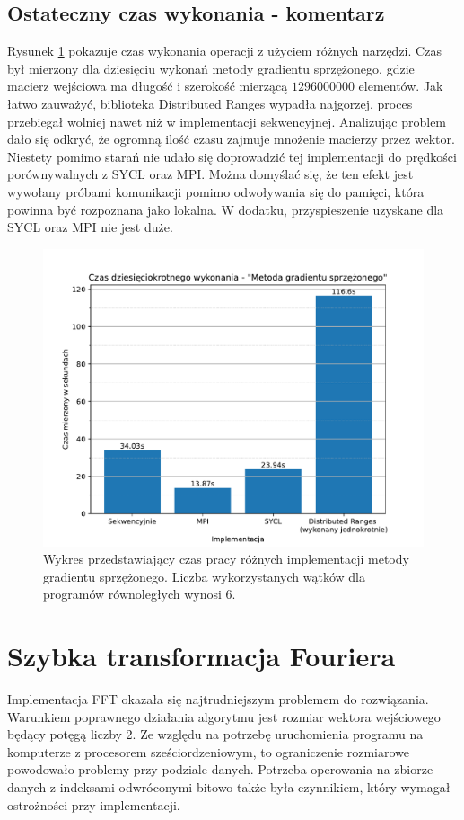 \documentclass[a4paper,12pt]{book} %
\begin{document}
\subsection{Ostateczny czas wykonania - komentarz}
Rysunek \ref{fig:wykonanie-cg} pokazuje czas wykonania operacji z użyciem różnych narzędzi. Czas był mierzony dla dziesięciu wykonań metody gradientu sprzężonego, gdzie macierz wejściowa ma długość i szerokość mierzącą $1296000000$ elementów. Jak łatwo zauważyć, biblioteka Distributed Ranges wypadła najgorzej, proces przebiegał wolniej nawet niż w implementacji sekwencyjnej. Analizując problem dało się odkryć, że ogromną ilość czasu zajmuje mnożenie macierzy przez wektor. Niestety pomimo starań nie udało się doprowadzić tej implementacji do prędkości porównywalnych z SYCL oraz MPI. Można domyślać się, że ten efekt jest wywołany próbami komunikacji pomimo odwoływania się do pamięci, która powinna być rozpoznana jako lokalna. W dodatku, przyspieszenie uzyskane dla SYCL oraz MPI nie jest duże.

\begin{figure}
	\centering
	\includegraphics[scale=0.8]{assets/czas_wykonania_cg.pdf}
	\caption{Wykres przedstawiający czas pracy różnych implementacji metody gradientu sprzężonego. Liczba wykorzystanych wątków dla programów równoległych wynosi 6.}
	\label{fig:wykonanie-cg}
\end{figure}

\section{Szybka transformacja Fouriera}
Implementacja FFT okazała się najtrudniejszym problemem do
rozwiązania. Warunkiem poprawnego działania algorytmu jest rozmiar wektora wejściowego będący potęgą liczby 2. Ze względu na potrzebę uruchomienia programu na komputerze z procesorem sześciordzeniowym, to ograniczenie rozmiarowe powodowało problemy przy podziale danych. Potrzeba operowania na zbiorze danych z indeksami odwróconymi bitowo także była czynnikiem, który wymagał ostrożności przy implementacji.
\end{document}
